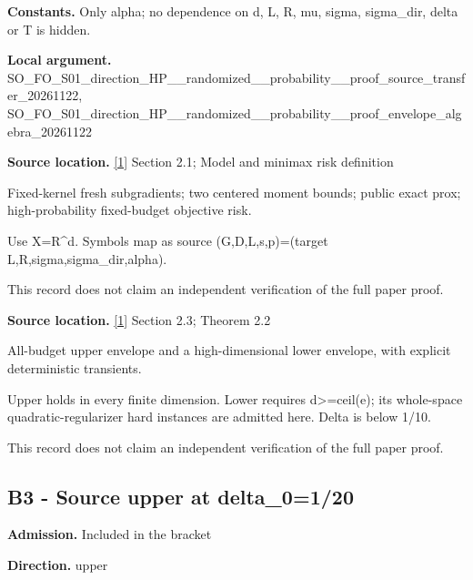 \documentclass[10pt,a4paper]{article}
\begin{document}
\textbf{Constants.} Only alpha; no dependence on d, L, R, mu, sigma, sigma\_dir, delta or T is hidden.



\textbf{Local argument.} SO\_FO\_S01\_direction\_HP\_\_\allowbreak{}randomized\_\_probability\_\allowbreak{}\_proof\_source\_transfer\_2\allowbreak{}0261122, SO\_FO\_S01\_direction\_HP\_\_\allowbreak{}randomized\_\_probability\_\allowbreak{}\_proof\_envelope\_algebra\_\allowbreak{}20261122



\textbf{Source location.} \href{https://arxiv.org/html/2610.00260v2}{[1]} Section 2.1; Model and minimax risk definition



Fixed-kernel fresh subgradients; two centered moment bounds; public exact prox; high-probability fixed-budget objective risk.



Use X=R\textasciicircum{}d. Symbols map as source (G,D,L,s,p)=(target L,R,sigma,sigma\_dir,alpha).



This record does not claim an independent verification of the full paper proof.



\textbf{Source location.} \href{https://arxiv.org/html/2610.00260v2}{[1]} Section 2.3; Theorem 2.2



All-budget upper envelope and a high-dimensional lower envelope, with explicit deterministic transients.



Upper holds in every finite dimension. Lower requires d>=ceil(e); its whole-space quadratic-regularizer hard instances are admitted here. Delta is below 1/10.



This record does not claim an independent verification of the full paper proof.



\subsection{B3 - Source upper at delta\_0=1/20}


\textbf{Admission.} Included in the bracket



\textbf{Direction.} upper
\end{document}
